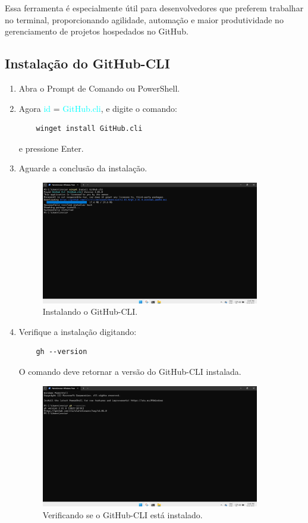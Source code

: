 Essa ferramenta é especialmente útil para desenvolvedores que preferem trabalhar no terminal, proporcionando agilidade, automação e maior produtividade no gerenciamento de projetos hospedados no GitHub.
\subsection{Instalação do GitHub-CLI}
\begin{enumerate}
  \item Abra o Prompt de Comando ou PowerShell.
  \item Agora \textcolor{cyan}{id} = \textcolor{cyan}{GitHub.cli}, e digite o comando:
  \begin{verbatim}
    winget install GitHub.cli
  \end{verbatim}
  e pressione Enter.
  \item Aguarde a conclusão da instalação.
  \begin{figure}[H]
    \centering
    \includegraphics[width=0.9\textwidth]{./assets/images/11_install_cli.png}
    \caption{Instalando o GitHub-CLI.}
    \label{fig:install_cli}
  \end{figure}
  \item Verifique a instalação digitando:
  \begin{verbatim}
    gh --version
  \end{verbatim}
    O comando deve retornar a versão do GitHub-CLI instalada.
    \begin{figure}[H]
    \centering
    \includegraphics[width=0.9\textwidth]{./assets/images/12_cli_version.png}
    \caption{Verificando se o GitHub-CLI está instalado.}
    \label{fig:cli_version}
  \end{figure}
\end{enumerate}
\par

